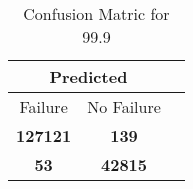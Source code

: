 \begin{table}[] 
\label{Table: Prediction Accuracy-DMD99.9OnlySunEKF-resetReflection-Reflection} 
\caption{Confusion Matric for 99.9} 
\centering 
\begin{tabular} 
 {@{}ccc@{}} 
\toprule 
\multicolumn{2}{c}{\textbf{Predicted}}
 \\ \midrule 
\multicolumn{1}{|c|}{Failure} & 
\multicolumn{1}{c|}{No Failure}
 \\ \midrule 
\multicolumn{1}{|c|}{\color{green}\textbf{127121}} & 
\multicolumn{1}{c|}{\color{red}\textbf{139}}
 \\ \midrule 
\multicolumn{1}{|c|}{\color{red}\textbf{53}} & 
\multicolumn{1}{c|}{\color{green}\textbf{42815}}
 \\ \bottomrule 
\end{tabular} 
\end{table} 
